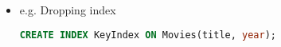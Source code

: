 \documentclass[12pt]{article}
\begin{document}
\begin{enumerate}[1.]
\begin{enumerate}[a)]
\begin{itemize}
\begin{itemize}
                \item e.g. Dropping index

    \begin{lstlisting}[language=SQL]
    CREATE INDEX KeyIndex ON Movies(title, year);
    \end{lstlisting}

            \end{itemize}
        \end{itemize}
    \end{enumerate}



\end{enumerate}
\end{document}
